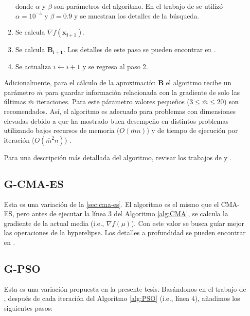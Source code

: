 \begin{enumerate}
      donde $\alpha$ y $\beta$ son parámetros del algoritmo. En el trabajo de \cite{Byrd1995} se
      utilizó $\alpha = 10^{-5}$ y $\beta = 0.9$ y se muestran los detalles de la búsqueda.


\item Se calcula $\nabla f(\boldsymbol{x_{i+1}})$.

\item Se calcula $\boldsymbol{B_{i+1}}$. Los detalles de este paso se pueden encontrar en \cite{Byrd1995}.

\item Se actualiza $i \gets i + 1$ y se regresa al paso 2.

\end{enumerate}


Adicionalmente, para el cálculo de la aproximación $\boldsymbol{B}$ el algoritmo recibe un parámetro
$\overline{m}$ para guardar información relacionada con la gradiente de solo las últimas $\overline{m}$ 
iteraciones. Para este párametro valores pequeños ($3 \leq \overline{m} \leq 20$) son recomendados.
Así, el algoritmo es adecuado para problemas con dimensiones elevadas debido a que
ha mostrado buen desempeño en distintos problemas utilizando bajos recursos de memoria
($O(\overline{m}n)$) y de tiempo de ejecución por iteración ($O(\overline{m}^2n)$) 
\citep{Zhu1997}.

Para una descripción más detallada del algoritmo, revisar los trabajos de \cite{Byrd1995} y \cite{Zhu1997}.

\subsection{G-CMA-ES}\label{sec:g-cma-es}

Esta es una variación de la \autoref{sec:cma-es}. El algoritmo es el mismo que el CMA-ES,
pero antes de ejecutar la línea 3 del Algoritmo \ref{alg:CMA}, se calcula la
gradiente de la actual media (i.e., $\nabla f(\mu)$). Con este valor se busca guíar
mejor las operaciones de la hyperelipse.
Los detalles a profundidad se pueden encontrar en \cite{Nikolaus2021}.

\subsection{G-PSO}\label{sec:g-pso}

Esta es una variación propuesta en la presente tesis.
Basándonos en el trabajo de \cite{Demidova2020}, después de cada iteración
del Algoritmo \ref{alg:PSO} (i.e., línea 4), añadimos los siguientes pasos:

